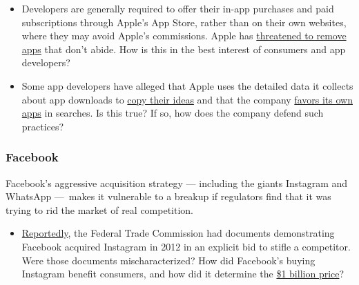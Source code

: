 \begin{itemize}
\tightlist
\item
  Developers are generally required to offer their in-app purchases and
  paid subscriptions through Apple's App Store, rather than on their own
  websites, where they may avoid Apple's commissions. Apple has
  \href{https://www.nytimes.com/2020/06/19/opinion/apple-app-store-hey.html}{threatened
  to remove apps} that don't abide. How is this in the best interest of
  consumers and app developers?
\end{itemize}

\begin{itemize}
\tightlist
\item
  Some app developers have alleged that Apple uses the detailed data it
  collects about app downloads to
  \href{https://appleinsider.com/articles/19/06/06/developers-talk-about-being-sherlocked-as-apple-uses-them-for-market-research}{copy
  their ideas} and that the company
  \href{https://www.nytimes.com/interactive/2019/09/09/technology/apple-app-store-competition.html}{favors
  its own apps} in searches. Is this true? If so, how does the company
  defend such practices?
\end{itemize}

\hypertarget{facebook}{%
\subsubsection{Facebook}\label{facebook}}

Facebook's aggressive acquisition strategy --- including the giants
Instagram and WhatsApp ---~makes it vulnerable to a breakup if
regulators find that it was trying to rid the market of real
competition.

\begin{itemize}
\tightlist
\item
  \href{https://nypost.com/2019/02/26/facebook-boasted-of-buying-instagram-to-kill-the-competition-sources/}{Reportedly},
  the Federal Trade Commission had documents demonstrating Facebook
  acquired Instagram in 2012 in an explicit bid to stifle a competitor.
  Were those documents mischaracterized? How did Facebook's buying
  Instagram benefit consumers, and how did it determine the
  \href{https://dealbook.nytimes.com/2012/04/09/facebook-buys-instagram-for-1-billion/}{\$1
  billion price}?
\end{itemize}

